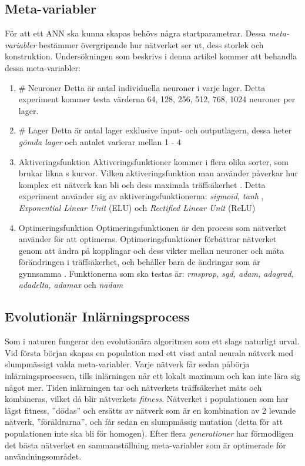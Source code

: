 \documentclass[a4paper, 12pt]{article}
\begin{document}
    \subsection{Meta-variabler}
    För att ett ANN ska kunna skapas behövs några startparametrar. Dessa \textit{meta-variabler} bestämmer övergripande hur nätverket ser ut, dess storlek och konstruktion. Undersökningen som beskrivs i denna artikel kommer att behandla dessa meta-variabler:
    \begin{enumerate}
      \item \# Neuroner
      \newline
      Detta är antal individuella neuroner i varje lager. Detta experiment kommer testa värderna 64, 128, 256, 512, 768, 1024 neuroner per lager.
      \item \# Lager
      \newline
      Detta är antal lager exklusive input- och outputlagern, dessa heter \textit{gömda lager} och antalet varierar mellan 1 - 4
      \item Aktiveringsfunktion
      \newline
      Aktiveringsfunktioner kommer i flera olika sorter, som brukar likna s kurvor. Vilken aktiveringsfunktion man använder påverkar hur komplex ett nätverk kan bli och dess maximala träffsäkerhet \parencite{jain1996artificial}. Detta experiment använder sig av aktiveringsfunktionerna: \textit{sigmoid, tanh} \parencite{karlik2011performance}, \textit{Exponential Linear Unit} (ELU) \parencite{clevert2015fast} och \textit{Rectified Linear Unit} (ReLU) \parencite{xu2015empirical}
      \item Optimeringsfunktion
      \newline
      Optimeringsfunktionen är den process som nätverket använder för att optimeras. Optimeringsfunktioner förbättrar nätverket genom att ändra på kopplingar och dess vikter mellan neuroner och mäta förändringen i träffsäkerhet, och behåller bara de ändringar som är gynnsamma \parencite{TypesofO34:online}. Funktionerna som ska testas är: \textit{rmsprop, sgd, adam, adagrad, adadelta, adamax} och \textit{nadam} \parencite{kingma2014adam}
    \end{enumerate}


    \subsection{Evolutionär Inlärningsprocess}
    Som i naturen fungerar den evolutionära algoritmen som ett slags naturligt urval. Vid första början skapas en population med ett visst antal neurala nätverk med slumpmässigt valda meta-variabler. Varje nätverk får sedan påbörja inlärningsprocessen, tills inlärningen når ett lokalt maximum och kan inte lära sig något mer. Tiden inlärningen tar och nätverkets träffsäkerhet mäts och kombineras, vilket då blir nätverkets \textit{fitness}. Nätverket i populationen som har lägst fitness, ”dödas” och ersätts av nätverk som är en kombination av 2 levande nätverk, ”föräldrarna”, och får sedan en slumpmässig mutation (detta för att populationen inte ska bli för homogen). Efter flera \textit{generationer} har förmodligen det bästa nätverket en sammanställning meta-variabler som är optimerade för användningsområdet. \parencite{yao1997new}
\end{document}
